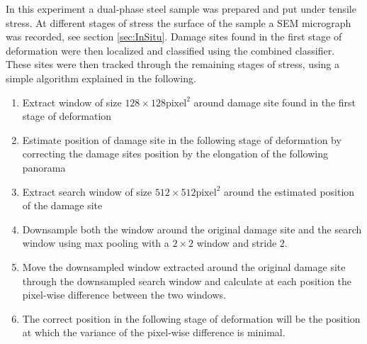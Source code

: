 In this experiment a dual-phase steel sample was prepared and put under tensile stress. At different stages of stress the surface of the sample a SEM micrograph was recorded, see section \ref{sec:InSitu}. Damage sites found in the first stage of deformation were then localized and classified using the combined classifier. These sites were then tracked through the remaining stages of stress, using a simple algorithm explained in the following. \\

\begin{enumerate}
\item Extract window of size $128\times 128 \text{pixel}^2$ around damage site found in the first stage of deformation
\item Estimate position of damage site in the following stage of deformation by correcting the damage sites position by the elongation of the following panorama
\item Extract search window of size $512\times 512 \text{pixel}^2$ around the estimated position of the damage site
\item Downsample both the window around the original damage site and the search window using max pooling with a $2\times 2$ window and stride $2$.
\item Move the downsampled window extracted around the original damage site through the downsampled search window and calculate at each position the pixel-wise difference between the two windows.
\item The correct position in the following stage of deformation will be the position at which the variance of the pixel-wise difference is minimal.
\end{enumerate}


